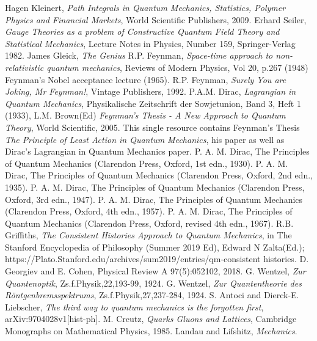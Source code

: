 \documentclass[12pt]{article}
\begin{document}
\begin{thebibliography}{}
 Hagen Kleinert, {\it Path Integrals in Quantum Mechanics, Statistics, Polymer Physics and Financial Markets}, World
Scientific Publishers, 2009.
 Erhard Seiler, {\it Gauge Theories as a problem of Constructive Quantum Field Theory and Statistical Mechanics}, Lecture
Notes in Physics, Number 159, Springer-Verlag 1982.
 James Gleick, {\it The Genius}
 R.P. Feynman, {\it Space-time approach to non-relativistic quantum mechanics}, Reviews of Modern Physics, Vol 20, p.267
(1948)
 Feynman's Nobel acceptance lecture (1965).
 R.P. Feynman, {\it Surely You are Joking, Mr Feynman!}, Vintage Publishers, 1992.
 P.A.M. Dirac, {\it Lagrangian in Quantum Mechanics}, 
Physikalische Zeitschrift der Sowjetunion, Band 3, Heft 1 (1933),
 L.M. Brown(Ed) {\it Feynman's Thesis - A New Approach to Quantum Theory}, World Scientific, 2005. This single
resource contains Feynman's Thesis {\it The Principle of Least Action in Quantum Mechanics}, his paper as well as Dirac's Lagrangian in Quantum Mechanics paper.
 P. A. M. Dirac, The Principles of Quantum Mechanics (Clarendon Press, Oxford, 1st edn., 1930). 
 P. A. M. Dirac, The Principles of Quantum Mechanics (Clarendon Press, Oxford, 2nd edn., 1935). 
 P. A. M. Dirac, The Principles of Quantum Mechanics (Clarendon Press, Oxford, 3rd edn., 1947). 
 P. A. M. Dirac, The Principles of Quantum Mechanics (Clarendon Press, Oxford, 4th edn., 1957). 
 P. A. M. Dirac, The Principles of Quantum Mechanics (Clarendon Press, Oxford, revised 4th edn., 1967). 
 R.B. Griffiths, {\it The Consistent Histories Approach to Quantum Mechanics}, in The Stanford Encyclopedia of
Philosophy (Summer 2019 Ed), Edward N Zalta(Ed.); https://Plato.Stanford.edu/archives/sum2019/entries/qm-consistent histories.
 D. Georgiev and E. Cohen, Physical Review A 97(5):052102, 2018.
 G. Wentzel, {\it Zur Quantenoptik}, Zs.f.Physik,22,193-99, 1924.
 G. Wentzel, {\it Zur Quantentheorie des R\"ontgenbremsspektrums}, Zs.f.Physik,27,237-284, 1924.
 S. Antoci and Dierck-E. Liebscher, {\it The third way to quantum mechanics is the forgotten first}, arXiv:9704028v1[hist-ph].
 M. Creutz, {\it Quarks Gluons and Lattices}, Cambridge Monographs on Mathematical Physics, 1985.
 Landau and Lifshitz, {\it Mechanics}.
\end{thebibliography}
\end{document}
